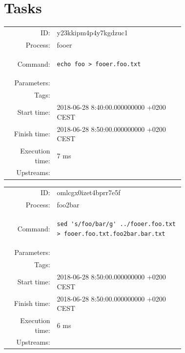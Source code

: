 \documentclass[11pt,oneside,openright]{memoir}
\begin{document}
\section*{Tasks}

    \begin{tcolorbox}[ title=fooer, 
                       colbacktitle=color1, 
                       colback=color1!50!white,
                       coltitle=black ]
        \small
        \begin{tabular}{rp{0.72\linewidth}}
ID: & y23kkipm4p4y7kgdzuc1 \\
Process: & fooer \\
Command: & \begin{lstlisting}
echo foo > fooer.foo.txt
\end{lstlisting} \\
Parameters:& \\
Tags: & \\
Start time:  & 2018-06-28 8:40:00.000000000 +0200 CEST \\
Finish time: & 2018-06-28 8:50:00.000000000 +0200 CEST \\
Execution time: & 7 ms \\
Upstreams: & \\
        \end{tabular}
    \end{tcolorbox}

    \begin{tcolorbox}[ title=foo2bar, 
                       colbacktitle=color2, 
                       colback=color2!50!white, 
                       coltitle=black ]
        \small
        \begin{tabular}{rp{0.72\linewidth}}
ID: & omlcgx0izet4bprr7e5f \\
Process: & foo2bar \\
Command: & \begin{lstlisting}
sed 's/foo/bar/g' ../fooer.foo.txt > fooer.foo.txt.foo2bar.bar.txt
\end{lstlisting} \\
Parameters:& \\
Tags: & \\
Start time: & 2018-06-28 8:50:00.000000000 +0200 CEST \\
Finish time: & 2018-06-28 8:50:00.000000000 +0200 CEST \\
Execution time: & 6 ms \\
Upstreams: & \\
        \end{tabular}
    \end{tcolorbox}
\end{document}

